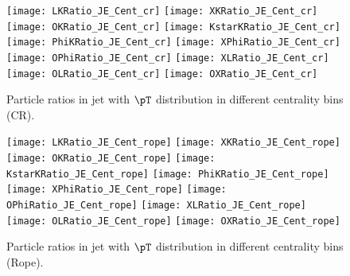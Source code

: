 \begin{figure}[ht]
        \begin{center}
                \texttt{[image: LKRatio\_JE\_Cent\_cr]}
                \texttt{[image: XKRatio\_JE\_Cent\_cr]}
                \texttt{[image: OKRatio\_JE\_Cent\_cr]}
                \texttt{[image: KstarKRatio\_JE\_Cent\_cr]}
                \texttt{[image: PhiKRatio\_JE\_Cent\_cr]}
                \texttt{[image: XPhiRatio\_JE\_Cent\_cr]}
                \texttt{[image: OPhiRatio\_JE\_Cent\_cr]}
                \texttt{[image: XLRatio\_JE\_Cent\_cr]}
                \texttt{[image: OLRatio\_JE\_Cent\_cr]}
                \texttt{[image: OXRatio\_JE\_Cent\_cr]}
        \end{center}
	\caption{Particle ratios in jet with $\pT$ distribution in different centrality bins (CR).}
        \label{fig:JEParRatioCentcr}
\end{figure}
\begin{figure}[ht]
        \begin{center}
                \texttt{[image: LKRatio\_JE\_Cent\_rope]}
                \texttt{[image: XKRatio\_JE\_Cent\_rope]}
                \texttt{[image: OKRatio\_JE\_Cent\_rope]}
                \texttt{[image: KstarKRatio\_JE\_Cent\_rope]}
                \texttt{[image: PhiKRatio\_JE\_Cent\_rope]}
                \texttt{[image: XPhiRatio\_JE\_Cent\_rope]}
                \texttt{[image: OPhiRatio\_JE\_Cent\_rope]}
                \texttt{[image: XLRatio\_JE\_Cent\_rope]}
                \texttt{[image: OLRatio\_JE\_Cent\_rope]}
                \texttt{[image: OXRatio\_JE\_Cent\_rope]}
        \end{center}
	\caption{Particle ratios in jet with $\pT$ distribution in different centrality bins (Rope).}
        \label{fig:JEParRatioCentrope}
\end{figure}

